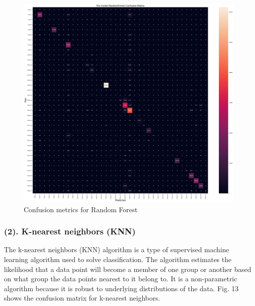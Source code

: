 \documentclass[10 pt,conference,final,]{IEEEtran}
\begin{document}
\begin{figure}

{\centering \includegraphics[width=0.9\linewidth]{img/fig12} 

}

\caption{Confusion metrics for Random Forest}\label{fig:unnamed-chunk-12}
\end{figure}

\subsubsection{(2). K-nearest neighbors
(KNN)}\label{k-nearest-neighbors-knn}

The k-nearest neighbors (KNN) algorithm is a type of supervised machine
learning algorithm used to solve classification. The algorithm estimates
the likelihood that a data point will become a member of one group or
another based on what group the data points nearest to it belong to. It
is a non-parametric algorithm because it is robust to underlying
distributions of the data. Fig. 13 shows the confusion matrix for
k-nearest neighbors.
\end{document}
